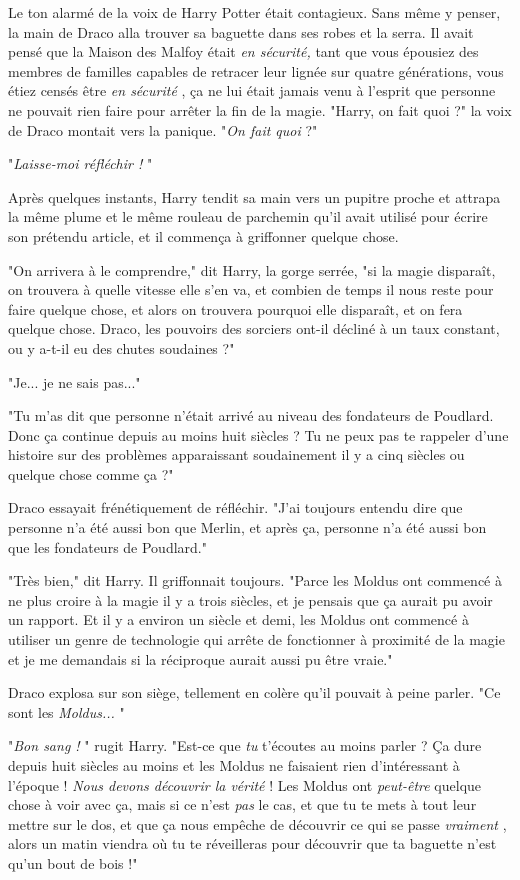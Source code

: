 Le ton alarmé de la voix de Harry Potter était contagieux. Sans même y penser, la main de Draco alla trouver sa baguette dans ses robes et la serra. Il avait pensé que la Maison des Malfoy était \emph{en sécurité,}  tant que vous épousiez des membres de familles capables de retracer leur lignée sur quatre générations, vous étiez censés être \emph{en sécurité} , ça ne lui était jamais venu à l'esprit que personne ne pouvait rien faire pour arrêter la fin de la magie. "Harry, on fait quoi ?" la voix de Draco montait vers la panique. "\emph{On fait quoi}  ?"

"\emph{Laisse-moi réfléchir !} "

Après quelques instants, Harry tendit sa main vers un pupitre proche et attrapa la même plume et le même rouleau de parchemin qu'il avait utilisé pour écrire son prétendu article, et il commença à griffonner quelque chose.

"On arrivera à le comprendre," dit Harry, la gorge serrée, "si la magie disparaît, on trouvera à quelle vitesse elle s'en va, et combien de temps il nous reste pour faire quelque chose, et alors on trouvera pourquoi elle disparaît, et on fera quelque chose. Draco, les pouvoirs des sorciers ont-il décliné à un taux constant, ou y a-t-il eu des chutes soudaines ?"

"Je... je ne sais pas..."

"Tu m'as dit que personne n'était arrivé au niveau des fondateurs de Poudlard. Donc ça continue depuis au moins huit siècles ? Tu ne peux pas te rappeler d'une histoire sur des problèmes apparaissant soudainement il y a cinq siècles ou quelque chose comme ça ?"

Draco essayait frénétiquement de réfléchir. "J'ai toujours entendu dire que personne n'a été aussi bon que Merlin, et après ça, personne n'a été aussi bon que les fondateurs de Poudlard."

"Très bien," dit Harry. Il griffonnait toujours. "Parce les Moldus ont commencé à ne plus croire à la magie il y a trois siècles, et je pensais que ça aurait pu avoir un rapport. Et il y a environ un siècle et demi, les Moldus ont commencé à utiliser un genre de technologie qui arrête de fonctionner à proximité de la magie et je me demandais si la réciproque aurait aussi pu être vraie."

Draco explosa sur son siège, tellement en colère qu'il pouvait à peine parler. "Ce sont les \emph{Moldus...} "

"\emph{Bon sang !} " rugit Harry. "Est-ce que \emph{tu}  t'écoutes au moins parler ? Ça dure depuis huit siècles au moins et les Moldus ne faisaient rien d'intéressant à l'époque ! \emph{Nous devons découvrir la vérité } ! Les Moldus ont \emph{peut-être}  quelque chose à voir avec ça, mais si ce n'est \emph{pas}  le cas, et que tu te mets à tout leur mettre sur le dos, et que ça nous empêche de découvrir ce qui se passe \emph{vraiment} , alors un matin viendra où tu te réveilleras pour découvrir que ta baguette n'est qu'un bout de bois !"

